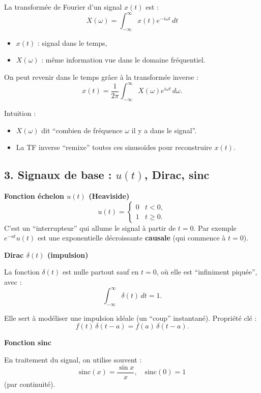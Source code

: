 La transformée de Fourier d’un signal $x(t)$ est :
\[
X(\omega) = \int_{-\infty}^{\infty} x(t) e^{-i\omega t} \, dt
\]
\begin{itemize}
    \item $x(t)$ : signal dans le temps,
    \item $X(\omega)$ : même information vue dans le domaine fréquentiel. \\
\end{itemize}

On peut revenir dans le temps grâce à la transformée inverse :
\[
x(t) = \frac{1}{2\pi} \int_{-\infty}^{\infty} X(\omega) e^{i\omega t} \, d\omega.
\]

Intuition :
\begin{itemize}
    \item $X(\omega)$ dit “combien de fréquence $\omega$ il y a dans le signal”.
    \item La TF inverse “remixe” toutes ces sinusoïdes pour reconstruire $x(t)$.
\end{itemize}

\subsection*{3. Signaux de base : $u(t)$, Dirac, sinc}

\textbf{Fonction échelon $u(t)$ (Heaviside)}  
\[
u(t) =
\begin{cases}
0 & t < 0,\\
1 & t \ge 0.
\end{cases}
\]
C’est un “interrupteur” qui allume le signal à partir de $t=0$.  
Par exemple $e^{-at}u(t)$ est une exponentielle décroissante \textbf{causale} (qui commence à $t=0$).

\medskip

\textbf{Dirac $\delta(t)$ (impulsion)}  

La fonction $\delta(t)$ est nulle partout sauf en $t=0$, où elle est “infiniment piquée”, avec :
\[
\int_{-\infty}^{\infty} \delta(t)\,dt = 1.
\]

Elle sert à modéliser une impulsion idéale (un “coup” instantané).  
Propriété clé :
\[
f(t)\,\delta(t-a) = f(a)\,\delta(t-a).
\]

\medskip

\textbf{Fonction sinc}  

En traitement du signal, on utilise souvent :
\[
\mathrm{sinc}(x) = \frac{\sin x}{x}, \quad \mathrm{sinc}(0)=1
\]
(par continuité). \\

